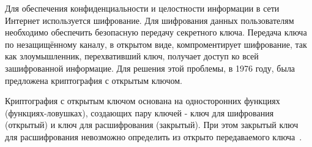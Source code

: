 \documentclass[times,specification,annotation]{itmo-student-thesis}
\begin{document}



\researchpublications{
\begin{refsection}
\nocite{kri20}
\printannobibliography
\end{refsection}
}

\tableofcontents

\startprefacepage

Для обеспечения конфиденциальности и целостности информации в сети Интернет используется шифрование.
Для шифрования данных пользователям необходимо обеспечить безопасную передачу секретного ключа.
Передача ключа по незащищённому каналу, в открытом виде, компроментирует шифрование, так как
злоумышленник, перехвативший ключ, получает доступ ко всей зашифрованной информацие.
Для решения этой проблемы, в 1976 году, была предложена  криптография с открытым ключом.

Криптография с открытым ключом основана на односторонних функциях (функциях-ловушках),
создающих пару ключей - ключ для шифрования (открытый) и ключ для расшифрования (закрытый).
При этом закрытый ключ для расшифрования  невозможно определить из открыто передаваемого ключа~\cite{dif77}.
\end{document}
